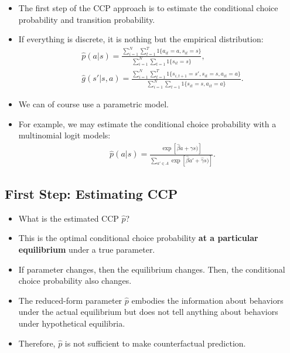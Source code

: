 \documentclass[
]{book}
\providecommand{\tightlist}{%
  \setlength{\itemsep}{0pt}\setlength{\parskip}{0pt}}
\begin{document}
\begin{itemize}
\tightlist
\item
  The first step of the CCP approach is to estimate the conditional choice probability and transition probability.
\item
  If everything is discrete, it is nothing but the empirical distribution:
  \begin{equation}
  \begin{split}
  &\hat{p}(a|s) = \frac{\sum_{i = 1}^N \sum_{t = 1}^T 1\{a_{it} = a, s_{it} = s\}}{\sum_{i = 1}^N \sum_{t = 1} 1\{s_{it} = s\}},\\
  &\hat{g}(s'|s, a) = \frac{\sum_{i = 1}^N \sum_{t = 1}^T 1\{s_{i, t + 1} = s', s_{it} = s, a_{it} = a\}}{\sum_{i = 1}^N \sum_{t = 1} 1\{s_{it} = s, a_{it} = a\}}.
  \end{split}
  \end{equation}
\item
  We can of course use a parametric model.
\item
  For example, we may estimate the conditional choice probability with a multinomial logit models:
  \begin{equation}
  \begin{split}
  &\hat{p}(a|s) = \frac{\exp[\hat{\beta} a + \hat{\gamma} s)]}{\sum_{a' \in A} \exp[\hat{\beta} a' + \hat{\gamma} s)]}.
  \end{split}
  \end{equation}
\end{itemize}

\hypertarget{first-step-estimating-ccp-1}{%
\subsection{First Step: Estimating CCP}\label{first-step-estimating-ccp-1}}

\begin{itemize}
\tightlist
\item
  What is the estimated CCP \(\hat{p}\)?
\item
  This is the optimal conditional choice probability \textbf{at a particular equilibrium} under a true parameter.
\item
  If parameter changes, then the equilibrium changes. Then, the conditional choice probability also changes.
\item
  The reduced-form parameter \(\hat{p}\) embodies the information about behaviors under the actual equilibrium but does not tell anything about behaviors under hypothetical equilibria.
\item
  Therefore, \(\hat{p}\) is not sufficient to make counterfactual prediction.
\end{itemize}
\end{document}

